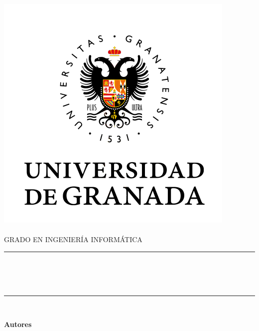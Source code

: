 
\begin{titlepage}
    \begin{minipage}{\textwidth}
        \centering

        \includegraphics[scale=0.4]{images/ugr.png}\\

        \textsc{\Large \asignatura{}\\[0.2cm]}
        \textsc{GRADO EN INGENIERÍA INFORMÁTICA}\\[1cm]

        \noindent\rule[-1ex]{\textwidth}{1pt}\\[1.5ex]
        \textsc{{\Huge \titulo\\[0.5ex]}}
        \textsc{{\Large \subtitulo\\}}
        \noindent\rule[-1ex]{\textwidth}{2pt}\\[2.5ex]

        \end{minipage}

        \vspace{0.3cm}

        \begin{minipage}{\textwidth}

        \centering

        \textbf{Autores}\\ {\autor{}}\\[1.5ex]
        \vspace{0.2cm}


\end{minipage}
\end{titlepage}
